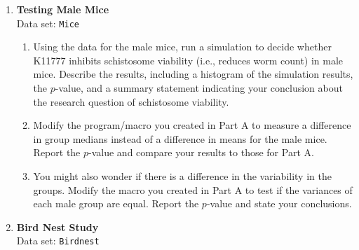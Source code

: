 \documentclass[
]{book}
\begin{document}
\begin{enumerate}
  One major advantage of randomization/permutation tests over classical methods is that they easily allow the use of test statistics other than the mean.
  \begin{enumerate}
    \item Modify the program/macro you created in Question 9 to measure a difference in group medians instead of a difference in means for the female mice. Report the $p$-value and compare your results to those for Question 9.
    \item You might also wonder if there is a difference in the variability in the groups. Modify the macro
you created in Question 9 to test whether the variances of the female groups are equal. Report the
$p$-value and state your conclusions
  \end{enumerate}
  
    
  \item \textbf{Testing Male Mice} \\
  Data set: \texttt{Mice} 
  \begin{enumerate}
    \item Using the data for the male mice, run a simulation to decide whether K11777 inhibits schistosome
viability (i.e., reduces worm count) in male mice. Describe the results, including a histogram
of the simulation results, the $p$-value, and a summary statement indicating your conclusion
about the research question of schistosome viability.
    \item Modify the program/macro you created in Part A to measure a difference in group medians
instead of a difference in means for the male mice. Report the $p$-value and compare your results
to those for Part A.
    \item You might also wonder if there is a difference in the variability in the groups. Modify the macro
you created in Part A to test if the variances of each male group are equal. Report the $p$-value and
state your conclusions.
  \end{enumerate}
  
  
  
  \item \textbf{Bird Nest Study} \\
  Data set: \texttt{Birdnest}
  

\end{enumerate}
\end{document}
